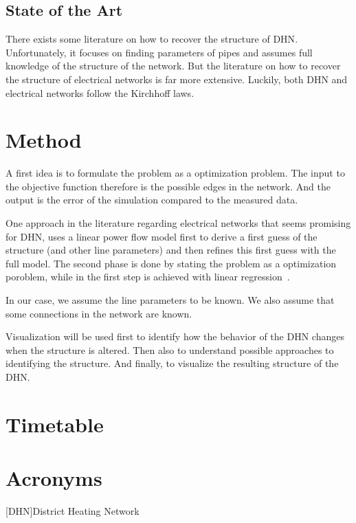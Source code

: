 \documentclass{scrartcl}
\begin{document}
    \subsection{State of the Art}

    There exists some literature on how to recover the structure of \ac{DHN}.
    Unfortunately, it focuses on finding parameters of pipes and assumes full knowledge of the structure of the network.
    But the literature on how to recover the structure of electrical networks is far more extensive.
    Luckily, both \ac{DHN} and electrical networks follow the Kirchhoff laws.

    \section{Method}

    A first idea is to formulate the problem as a optimization problem.
    The input to the objective function therefore is the possible edges in the network.
    And the output is the error of the simulation compared to the measured data.

    One approach in the literature regarding electrical networks that seems promising for \ac{DHN}, uses a linear power flow model first to derive a first guess of the structure (and other line parameters) and then refines this first guess with the full model.
    The second phase is done by stating the problem as a optimization poroblem, while in the first step is achieved with linear regression~\cite{wang2024identification}.

    In our case, we assume the line parameters to be known.
    We also assume that some connections in the network are known.

    Visualization will be used first to identify how the behavior of the \ac{DHN} changes when the structure is altered.
    Then also to understand possible approaches to identifying the structure.
    And finally, to visualize the resulting structure of the \ac{DHN}.

    \printbibliography

    \section{Timetable}

    \section{Acronyms}

    \begin{acronym}
        [DHN]{District Heating Network}
    \end{acronym}
\end{document}
